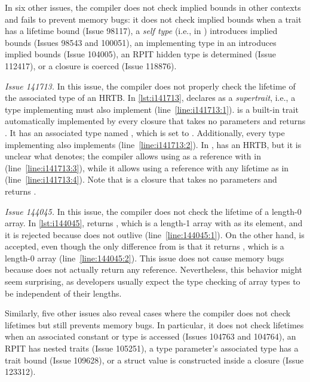 In six other issues, the compiler does not check implied bounds in other
contexts and fails to prevent memory bugs:
%
it does not check implied bounds when
%
a trait has a lifetime bound (Issue 98117),
%
a \emph{self type} (i.e.,  in ) introduces implied bounds
(Issues 98543 and 100051),
%
an implementing type in an  introduces implied bounds (Issue 104005),
%
an RPIT hidden type is determined (Issue 112417),
%
or a closure is coerced (Issue 118876).

{\it Issue 141713.}
%
In this issue, the compiler does not properly check the lifetime of the associated
type of an HRTB.
%
In \cref{lst:i141713},  declares  as a \emph{supertrait},
i.e., a type implementing  must also implement 
(line~\ref{line:i141713:1}).
%
 is a built-in trait automatically implemented by every closure
that takes no parameters and returns .
%
It has an associated type named , which is set to .
%
Additionally, every type implementing  also implements 
(line~\ref{line:i141713:2}).
%
In ,  has an HRTB, but it is unclear what  denotes;
%
the compiler allows using  as a reference with  in
 (line~\ref{line:i141713:3}), while it allows using a reference with any
lifetime as  in  (line~\ref{line:i141713:4}).
%
Note that  is a closure that takes no parameters and returns .

{\it Issue 144045.}
%
In this issue, the compiler does not check the lifetime of a length-0 array.
%
In \cref{lst:i144045},  returns \C{[v; 1]}, which is a length-1 array
with  as its element, and it is rejected because  does not outlive
 (line~\ref{line:144045:1}).
%
On the other hand,  is accepted, even though the only difference from
 is that it returns \C{[v; 0]}, which is a length-0 array
(line~\ref{line:144045:2}).
%
This issue does not cause memory bugs because  does not actually return
any reference.
%
Nevertheless, this behavior might seem surprising, as developers usually expect
the type checking of array types to be independent of their lengths.

Similarly, five other issues also reveal cases where the compiler does not check
lifetimes but still prevents memory bugs.
%
In particular, it does not check lifetimes when
%
an associated constant or type is accessed (Issues 104763 and 104764),
%
an RPIT has nested  traits (Issue 105251),
%
a type parameter's associated type has a trait bound (Issue 109628),
%
or a struct value is constructed inside a closure (Issue 123312).

